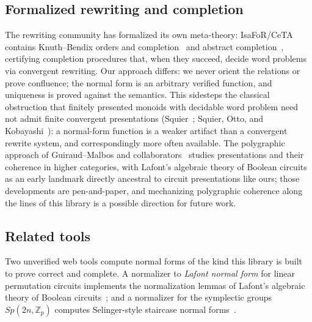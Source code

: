 \subsection{Formalized rewriting and completion}\label{sec:rel-rw}

The rewriting community has formalized its own meta-theory: IsaFoR/CeTA
contains Knuth--Bendix orders and completion~\cite{sternagel2013kb} and
abstract completion~\cite{hirokawa2019abstract}, certifying completion
procedures that, when they succeed, decide word problems via
convergent rewriting.  Our approach differs: we never
orient the relations or prove confluence; the normal form is an
arbitrary verified function, and uniqueness is proved against the
semantics.  This sidesteps the classical obstruction that finitely
presented monoids with decidable word problem need not admit finite
convergent presentations (Squier~\cite{squier1987word}; Squier, Otto,
and Kobayashi~\cite{squier1994finiteness}): a normal-form function is
a weaker artifact
than a convergent rewrite system, and correspondingly more often
available.  The polygraphic approach of Guiraud--Malbos and
collaborators~\cite{guiraud2018polygraphs,ara2025polygraphs} studies
presentations and their coherence in higher categories, with Lafont's
algebraic theory of Boolean circuits~\cite{lafont2003boolean} as an early
landmark directly ancestral to circuit presentations like ours; those
developments are pen-and-paper, and mechanizing polygraphic coherence
along the lines of this library is a possible direction for future work.

\subsection{Related tools}\label{sec:tools}

Two unverified web tools compute normal forms of the kind this
library is built to prove correct and complete.  A
normalizer to \emph{Lafont normal form} for linear permutation circuits
implements the normalization lemmas of Lafont's algebraic theory of Boolean
circuits~\cite{lafont2003boolean,lafontlp-tool}; and a normalizer for the
symplectic groups $Sp(2n,\mathbb{Z}_p)$ computes Selinger-style staircase
normal forms~\cite{qupit-tool}.
